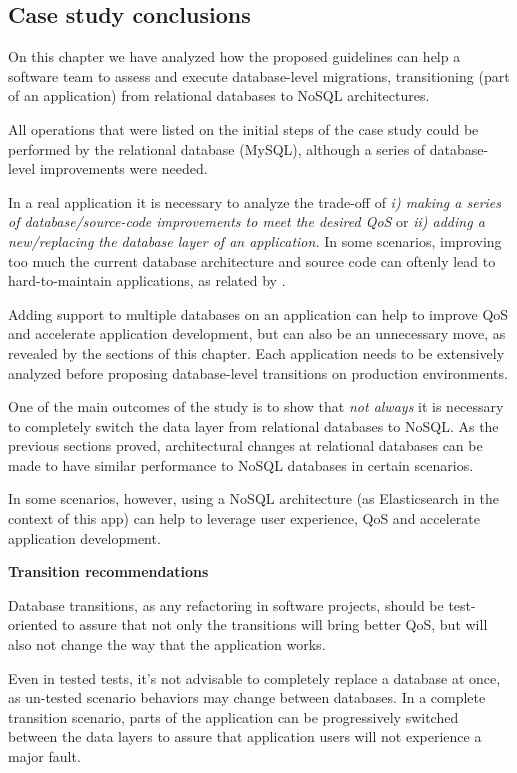 \subsection{Case study conclusions}
On this chapter we have analyzed how the proposed guidelines can help a software team to assess and execute database-level migrations, transitioning (part of an application) from relational databases to NoSQL architectures.

All operations that were listed on the initial steps of the case study could be performed by the relational database (MySQL), although a series of database-level improvements were needed. 

In a real application it is necessary to analyze the trade-off of \textit{i) making a series of database/source-code improvements to meet the desired QoS} or \textit{ii) adding a new/replacing the database layer of an application.} In some scenarios, improving too much the current database architecture and source code can oftenly lead to hard-to-maintain applications, as related by \cite{scoutmigration}. 

Adding support to multiple databases on an application can help to improve QoS and accelerate application development, but can also be an unnecessary move, as revealed by the sections of this chapter. Each application needs to be extensively analyzed before proposing database-level transitions on production environments. 

One of the main outcomes of the study is to show that \textit{not always} it is necessary to completely switch the data layer from relational databases to NoSQL. As the previous sections proved, architectural changes at relational databases can be made to have similar performance to NoSQL databases in certain scenarios. 

In some scenarios, however, using a NoSQL architecture (as Elasticsearch in the context of this app) can help to leverage user experience, QoS and accelerate application development.  


\textbf{Transition recommendations}

Database transitions, as any refactoring in software projects, should be test-oriented to assure that not only the transitions will bring better QoS, but will also not change the way that the application works. 

Even in tested tests, it's not advisable to completely replace a database at once, as un-tested scenario behaviors may change between databases. In a complete transition scenario, parts of the application can be progressively switched between the data layers to assure that application users will not experience a major fault. 

